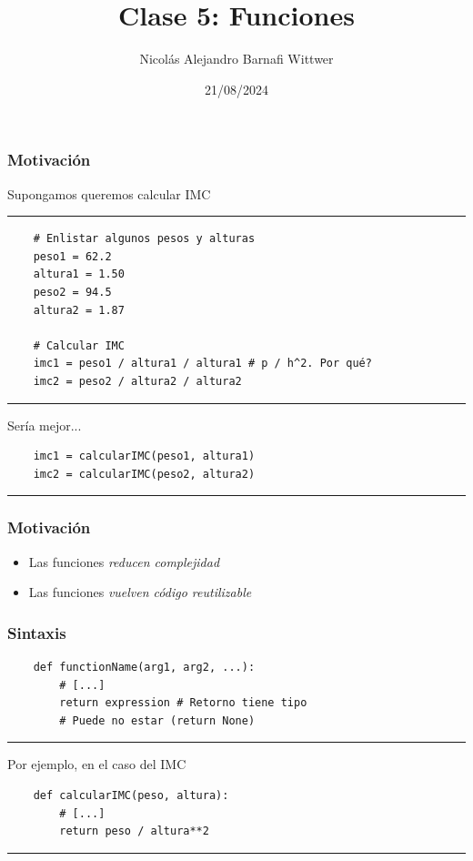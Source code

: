 \documentclass[14pt,aspectratio=169,xcolor=dvipsnames]{beamer}
\title[short title]{Clase 5: Funciones}
\subtitle{}
\author[NA Barnafi] {Nicolás Alejandro Barnafi Wittwer}
\institute[UC|CMM] 
{
    Pontificia Universidad Católica de Chile \\
    Centro de Modelamiento Matemático
}
\date{21/08/2024}
\begin{document}
\begin{frame}
    \maketitle
\end{frame}
\begin{frame}[fragile]\frametitle{Motivación}
Supongamos queremos calcular IMC

\rule{\textwidth}{1pt}
\scriptsize
\begin{verbatim}
    # Enlistar algunos pesos y alturas
    peso1 = 62.2
    altura1 = 1.50
    peso2 = 94.5
    altura2 = 1.87
    
    # Calcular IMC
    imc1 = peso1 / altura1 / altura1 # p / h^2. Por qué?
    imc2 = peso2 / altura2 / altura2
\end{verbatim}
\rule{\textwidth}{1pt}
\pause Sería mejor... 
\begin{verbatim}
    imc1 = calcularIMC(peso1, altura1)
    imc2 = calcularIMC(peso2, altura2)
\end{verbatim}
\rule{\textwidth}{1pt}

\end{frame}
\begin{frame}\frametitle{Motivación}
    \begin{itemize}
        \item Las funciones \emph{reducen complejidad}
        \item Las funciones \emph{vuelven código reutilizable}
    \end{itemize}
\end{frame}
\begin{frame}[fragile]\frametitle{Sintaxis}

\begin{verbatim}
    def functionName(arg1, arg2, ...):
        # [...]
        return expression # Retorno tiene tipo 
        # Puede no estar (return None)
\end{verbatim}
\rule{\textwidth}{1pt}
Por ejemplo, en el caso del IMC
\begin{verbatim}
    def calcularIMC(peso, altura):
        # [...]
        return peso / altura**2
\end{verbatim}
\rule{\textwidth}{1pt}
\end{frame}
\end{document}

